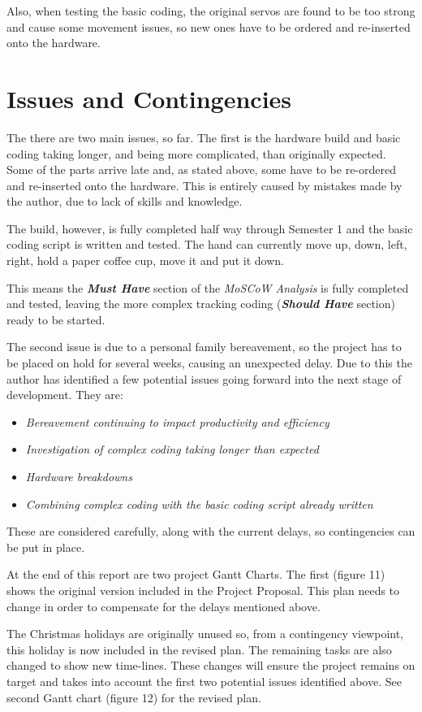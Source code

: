 \documentclass[progress]{cmpreport}
\begin{document}
{{{{{{Also, when testing the basic coding, the original servos are found to be too strong and cause some movement issues, so new ones have to be ordered and re-inserted onto the hardware. 

\section{Issues and Contingencies}
The there are two main issues, so far. The first is the hardware build and basic coding taking longer, and being more complicated, than originally expected. Some of the parts arrive late and, as stated above, some have to be re-ordered and re-inserted onto the hardware. This is entirely caused by mistakes made by the author, due to lack of skills and knowledge. 

The build, however, is fully completed half way through Semester 1 and the basic coding script is written and tested. The hand can currently move up, down, left, right, hold a paper coffee cup, move it and put it down. 

This means the \textbf{\textit{Must Have}} section of the \textit{MoSCoW Analysis} is fully completed and tested, leaving the more complex tracking coding (\textbf{\textit{Should Have}} section) ready to be started. 

The second issue is due to a personal family bereavement, so the project has to be placed on hold for several weeks, causing an unexpected delay. Due to this the author has identified a few potential issues going forward into the next stage of development. They are:
\begin{itemize}		
	\item \textit{Bereavement continuing to impact productivity and efficiency}
	\item \textit{Investigation of complex coding taking longer than expected}
	\item \textit{Hardware breakdowns}
	\item \textit{Combining complex coding with the basic coding script already written}
\end{itemize}
These are considered carefully, along with the current delays, so contingencies can be put in place. 

At the end of this report are two project Gantt Charts. The first (figure 11) shows the original version included in the Project Proposal. This plan needs to change in order to compensate for the delays mentioned above. 

The Christmas holidays are originally unused so, from a contingency viewpoint, this holiday is now included in the revised plan. The remaining tasks are also changed to show new time-lines. These changes will ensure the project remains on target and takes into account the first two potential issues identified above. See second Gantt chart (figure 12) for the revised plan. 

}}}}}}
\end{document}
